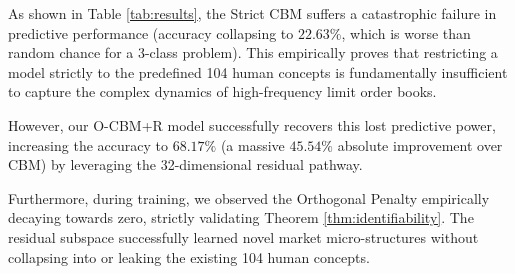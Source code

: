 \documentclass[twoside,11pt]{article}
\begin{document}
As shown in Table \ref{tab:results}, the Strict CBM suffers a catastrophic failure in predictive performance (accuracy collapsing to $22.63\%$, which is worse than random chance for a 3-class problem). This empirically proves that restricting a model strictly to the predefined 104 human concepts is fundamentally insufficient to capture the complex dynamics of high-frequency limit order books. 

However, our O-CBM+R model successfully recovers this lost predictive power, increasing the accuracy to $68.17\%$ (a massive $45.54\%$ absolute improvement over CBM) by leveraging the 32-dimensional residual pathway.

Furthermore, during training, we observed the Orthogonal Penalty empirically decaying towards zero, strictly validating Theorem \ref{thm:identifiability}. The residual subspace successfully learned novel market micro-structures without collapsing into or leaking the existing 104 human concepts.



\end{document}
